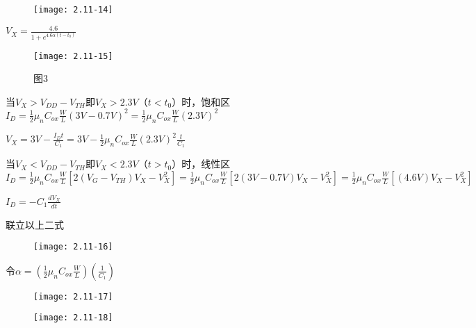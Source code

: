 	\begin{figure}[H] %
	\begin{minipage}{\linewidth}
		\texttt{[image: 2.11-14]}
	\end{minipage}
\end{figure}



$V_X=\frac{4.6}{1+e^{4.6 \alpha (t-t_0)}}$

		\begin{figure}[H] %
	\begin{minipage}{\linewidth}
		\texttt{[image: 2.11-15]}
	\end{minipage}
	\caption*{图3} %
\end{figure}

\scalebox{3}{（d）}

当$V_{X}>V_{DD}-V_{TH}$即$V_{X}>2.3V$（$t<t_0$）时，饱和区$I_D=\frac{1}{2}\mu_nC_{ox}\frac{W}{L}(3V-0.7V)^2=\frac{1}{2}\mu_nC_{ox}\frac{W}{L}(2.3V)^2$

$V_X=3V-\frac{I_Dt}{C_1}=3V-\frac{1}{2}\mu_nC_{ox}\frac{W}{L}(2.3V)^2\frac{t}{C_1}$

当$V_{X}<V_{DD}-V_{TH}$即$V_{X}<2.3V$（$t>t_0$）时，线性区$I_D=\frac{1}{2}\mu_nC_{ox}\frac{W}{L}[2(V_{G}-V_{TH})V_{X}-V_{X}^2]=\frac{1}{2}\mu_nC_{ox}\frac{W}{L}[2(3V-0.7V)V_{X}-V_{X}^2]=\frac{1}{2}\mu_nC_{ox}\frac{W}{L}[(4.6V)V_{X}-V_{X}^2]$

$I_D=-C_1\frac{dV_X}{dt}$

联立以上二式

\begin{figure}[H] %
	\begin{minipage}{\linewidth}
		\texttt{[image: 2.11-16]}
	\end{minipage}
\end{figure}

令$\alpha=(\frac{1}{2}\mu_nC_{ox}\frac{W}{L})(\frac{1}{C_1})$

\begin{figure}[H] %
	\begin{minipage}{\linewidth}
		\texttt{[image: 2.11-17]}
	\end{minipage}
\end{figure}

\begin{figure}[H] %
	\begin{minipage}{\linewidth}
		\texttt{[image: 2.11-18]}
	\end{minipage}
\end{figure}

